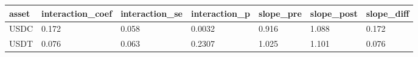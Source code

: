 \begin{tabular}{lllllll}
\toprule
asset & interaction_coef & interaction_se & interaction_p & slope_pre & slope_post & slope_diff \\
\midrule
USDC & 0.172 & 0.058 & 0.0032 & 0.916 & 1.088 & 0.172 \\
USDT & 0.076 & 0.063 & 0.2307 & 1.025 & 1.101 & 0.076 \\
\bottomrule
\end{tabular}
